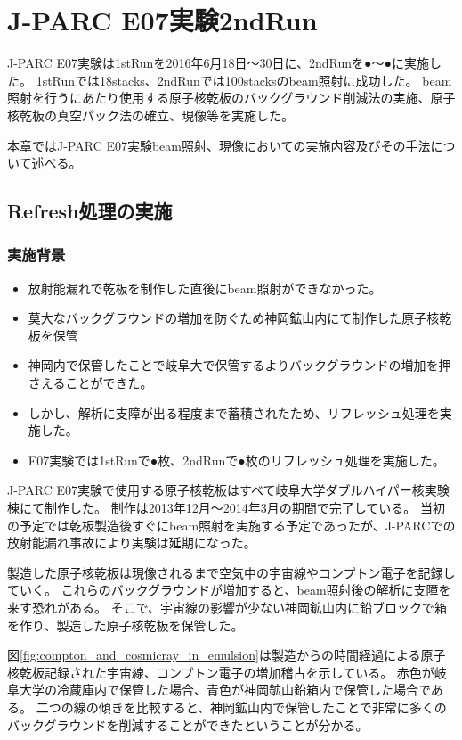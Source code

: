 \documentclass[12pt,a4paper]{jarticle}
\begin{document}
\newpage
\section{J-PARC E07実験2ndRun}
J-PARC E07実験は1stRunを2016年6月18日〜30日に、2ndRunを●～●に実施した。
1stRunでは18stacks、2ndRunでは100stacksのbeam照射に成功した。
beam照射を行うにあたり使用する原子核乾板のバックグラウンド削減法の実施、原子核乾板の真空パック法の確立、現像等を実施した。
\par
本章ではJ-PARC E07実験beam照射、現像においての実施内容及びその手法について述べる。
\subsection{Refresh処理の実施}
\subsubsection{実施背景}
\begin{itemize}
 \item 放射能漏れで乾板を制作した直後にbeam照射ができなかった。
 \item 莫大なバックグラウンドの増加を防ぐため神岡鉱山内にて制作した原子核乾板を保管
 \item 神岡内で保管したことで岐阜大で保管するよりバックグラウンドの増加を押さえることができた。
 \item しかし、解析に支障が出る程度まで蓄積されたため、リフレッシュ処理を実施した。
 \item E07実験では1stRunで●枚、2ndRunで●枚のリフレッシュ処理を実施した。
\end{itemize}
J-PARC E07実験で使用する原子核乾板はすべて岐阜大学ダブルハイパー核実験棟にて制作した。
制作は2013年12月～2014年3月の期間で完了している。
当初の予定では乾板製造後すぐにbeam照射を実施する予定であったが、J-PARCでの放射能漏れ事故により実験は延期になった。
\par
製造した原子核乾板は現像されるまで空気中の宇宙線やコンプトン電子を記録していく。
これらのバックグラウンドが増加すると、beam照射後の解析に支障を来す恐れがある。
そこで、宇宙線の影響が少ない神岡鉱山内に鉛ブロックで箱を作り、製造した原子核乾板を保管した。
\par
図\ref{fig:compton_and_cosmicray_in_emulsion}は製造からの時間経過による原子核乾板記録された宇宙線、コンプトン電子の増加稽古を示している。
赤色が岐阜大学の冷蔵庫内で保管した場合、青色が神岡鉱山鉛箱内で保管した場合である。
二つの線の傾きを比較すると、神岡鉱山内で保管したことで非常に多くのバックグラウンドを削減することができたということが分かる。
\end{document}
